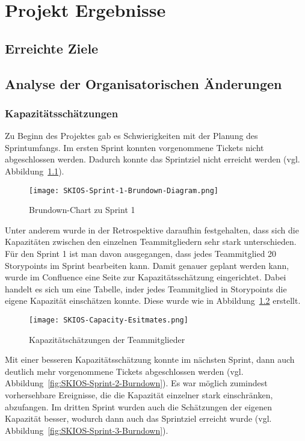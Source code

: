 
\chapter{Projekt Ergebnisse}

\section{Erreichte Ziele}

\section{Analyse der Organisatorischen Änderungen}

\subsection{Kapazitätsschätzungen}

Zu Beginn des Projektes gab es Schwierigkeiten mit der Planung des Sprintumfangs.
Im ersten Sprint konnten vorgenommene Tickets nicht abgeschlossen werden. 
Dadurch konnte das Sprintziel nicht erreicht werden (vgl. Abbildung~\ref{fig:SKIOS-Sprint-1-Brundown}).

\begin{figure}[h]
    \texttt{[image: SKIOS-Sprint-1-Brundown-Diagram.png]}
    \caption{Brundown-Chart zu Sprint 1}
    \label{fig:SKIOS-Sprint-1-Brundown}
\end{figure}

Unter anderem wurde in der Retrospektive daraufhin festgehalten, 
dass sich die Kapazitäten zwischen den einzelnen Teammitgliedern sehr stark unterschieden.
Für den Sprint 1 ist man davon ausgegangen, dass jedes Teammitglied 20 Storypoints im Sprint bearbeiten kann.
Damit genauer geplant werden kann, wurde im Confluence eine Seite zur Kapazitätsschätzung eingerichtet.
Dabei handelt es sich um eine Tabelle, inder jedes Teammitglied in Storypoints die eigene Kapazität einschätzen konnte.
Diese wurde wie in Abbildung~\ref{fig:Capacitytable} erstellt. 

\begin{figure}[h]
    \texttt{[image: SKIOS-Capacity-Esitmates.png]}
    \caption{Kapazitätschätzungen der Teammitglieder}
    \label{fig:Capacitytable}
\end{figure}

Mit einer besseren Kapazitätsschätzung konnte im nächsten Sprint, dann auch deutlich mehr vorgenommene Tickets abgeschlossen werden (vgl. Abbildung~\ref{fig:SKIOS-Sprint-2-Burndown}).
Es war möglich zumindest vorhersehbare Ereignisse, die die Kapazität einzelner stark einschränken, abzufangen.
Im dritten Sprint wurden auch die Schätzungen der eigenen Kapazität besser, wodurch dann auch das Sprintziel erreicht wurde (vgl. Abbildung~\ref{fig:SKIOS-Sprint-3-Burndown}).

